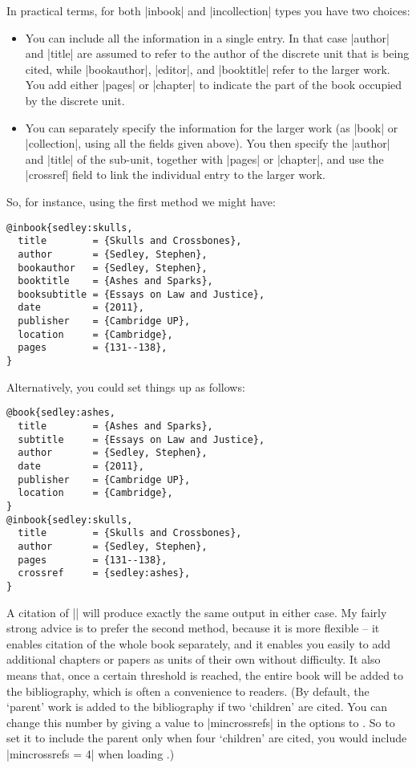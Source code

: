 In practical terms, for both |inbook| and |incollection| types you
have two choices:
\begin{itemize}
\item You can include all the information in a single entry. In that
  case |author| and |title| are assumed to refer to the author of the
  discrete unit that is being cited, while |bookauthor|, |editor|, and
  |booktitle| refer to the larger work. You add either |pages| or
  |chapter| to indicate the part of the book occupied by the discrete
  unit.
\item You can separately specify the information for the larger work
  (as |book| or |collection|, using all the fields given above). You
  then specify the |author| and |title| of the sub-unit, together with
  |pages| or |chapter|, and use the |crossref| field to link the
  individual entry to the larger work.
\end{itemize}

So, for instance, using the first method we might have:
\begin{Verbatim}
@inbook{sedley:skulls,
  title        = {Skulls and Crossbones},
  author       = {Sedley, Stephen},
  bookauthor   = {Sedley, Stephen},
  booktitle    = {Ashes and Sparks},
  booksubtitle = {Essays on Law and Justice},
  date         = {2011},
  publisher    = {Cambridge UP},
  location     = {Cambridge},
  pages        = {131--138},
}
\end{Verbatim}

Alternatively, you could set things up as follows:
\begin{Verbatim}
@book{sedley:ashes,
  title        = {Ashes and Sparks},
  subtitle     = {Essays on Law and Justice},
  author       = {Sedley, Stephen},
  date         = {2011},
  publisher    = {Cambridge UP},
  location     = {Cambridge},
}
@inbook{sedley:skulls,
  title        = {Skulls and Crossbones},
  author       = {Sedley, Stephen},
  pages        = {131--138},
  crossref     = {sedley:ashes},
}
\end{Verbatim}

A citation of |\cite{sedley:skulls}| will produce exactly the same
output in either case. My fairly strong advice is to prefer the second
method, because it is more flexible -- it enables citation of the
whole book separately, and it enables you easily to add additional
chapters or papers as units of their own without difficulty. It also
means that, once a certain threshold is reached, the entire book will
be added to the bibliography, which is often a convenience to
readers. (By default, the `parent' work is added to the bibliography
if two `children' are cited. You can change this number by giving a
value to |mincrossrefs| in the options to \biblatex. So to set it to
include the parent only when four `children' are cited, you would
include |mincrossrefs = 4| when loading \biblatex.)

